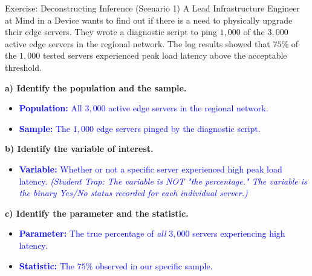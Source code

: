 \documentclass[aspectratio=169]{beamer}
\begin{document}
\begin{frame}{Exercise: Deconstructing Inference (Scenario 1)}
    \small
    A Lead Infrastructure Engineer at Mind in a Device wants to find out if there is a need to physically upgrade their edge servers. They wrote a diagnostic script to ping $1,000$ of the $3,000$ active edge servers in the regional network. The log results showed that $75\%$ of the $1,000$ tested servers experienced peak load latency above the acceptable threshold.
    
    \textbf{a) Identify the population and the sample.} \pause
    \begin{itemize}
        \item \textcolor{blue}{\textbf{Population:} All $3,000$ active edge servers in the regional network.}
        \item \textcolor{blue}{\textbf{Sample:} The $1,000$ edge servers pinged by the diagnostic script.}
    \end{itemize} \pause
    
    \textbf{b) Identify the variable of interest.} \pause
    \begin{itemize}
        \item \textcolor{blue}{\textbf{Variable:} Whether or not a specific server experienced high peak load latency. \textit{(Student Trap: The variable is NOT "the percentage." The variable is the binary Yes/No status recorded for each individual server.)}}
    \end{itemize} \pause
    
    \textbf{c) Identify the parameter and the statistic.} \pause
    \begin{itemize}
        \item \textcolor{blue}{\textbf{Parameter:} The true percentage of \emph{all} $3,000$ servers experiencing high latency.}
        \item \textcolor{blue}{\textbf{Statistic:} The $75\%$ observed in our specific sample.}
    \end{itemize}
\end{frame}
\end{document}
